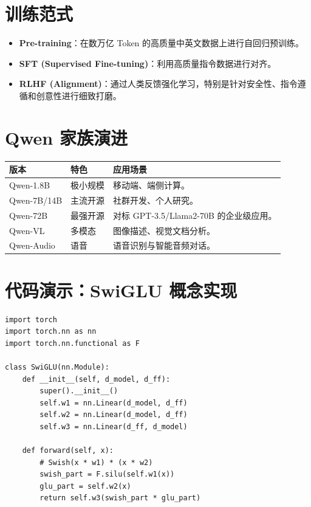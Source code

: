 \documentclass[12pt, a4paper]{article}
\begin{document}
\section{训练范式}
\begin{itemize}
    \item \textbf{Pre-training}：在数万亿 Token 的高质量中英文数据上进行自回归预训练。
    \item \textbf{SFT (Supervised Fine-tuning)}：利用高质量指令数据进行对齐。
    \item \textbf{RLHF (Alignment)}：通过人类反馈强化学习，特别是针对安全性、指令遵循和创意性进行细致打磨。
\end{itemize}

\section{Qwen 家族演进}
\begin{table}[h]
\centering
\begin{tabularx}{\textwidth}{|l|l|X|}
\hline
\textbf{版本} & \textbf{特色} & \textbf{应用场景} \\
\hline
Qwen-1.8B & 极小规模 & 移动端、端侧计算。 \\
\hline
Qwen-7B/14B & 主流开源 & 社群开发、个人研究。 \\
\hline
Qwen-72B & 最强开源 & 对标 GPT-3.5/Llama2-70B 的企业级应用。 \\
\hline
Qwen-VL & 多模态 & 图像描述、视觉文档分析。 \\
\hline
Qwen-Audio & 语音 & 语音识别与智能音频对话。 \\
\hline
\end{tabularx}
\end{table}

\section{代码演示：SwiGLU 概念实现}
\begin{lstlisting}
import torch
import torch.nn as nn
import torch.nn.functional as F

class SwiGLU(nn.Module):
    def __init__(self, d_model, d_ff):
        super().__init__()
        self.w1 = nn.Linear(d_model, d_ff)
        self.w2 = nn.Linear(d_model, d_ff)
        self.w3 = nn.Linear(d_ff, d_model)

    def forward(self, x):
        # Swish(x * w1) * (x * w2)
        swish_part = F.silu(self.w1(x))
        glu_part = self.w2(x)
        return self.w3(swish_part * glu_part)
\end{lstlisting}
\end{document}
